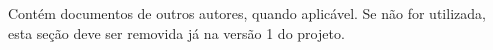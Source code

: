 

Contém documentos de outros autores, quando aplicável. Se não for utilizada, esta seção deve ser removida já na versão 1 do projeto.